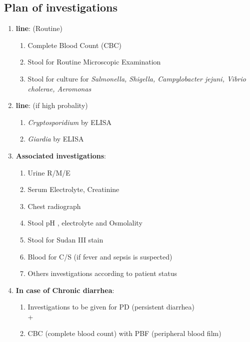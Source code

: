 \documentclass[11pt,a4paper]{report}
\begin{document}
\subsection{Plan of investigations}
\begin{enumerate}
	\item \textbf{ line}: (Routine)
	\begin{enumerate}
		\item Complete Blood Count (CBC)
		\item Stool for Routine Microscopic Examination  
		\item Stool for culture for \textit{Salmonella, Shigella, Campylobacter jejuni, Vibrio cholerae, Aeromonas}
	\end{enumerate}
	\item \textbf{ line}: (if high probality)
	\begin{enumerate}
		\item \textit{Cryptosporidium} by  ELISA
		\item \textit{Giardia} by ELISA
	\end{enumerate}
	\item \textbf{Associated investigations}:
	\begin{enumerate}
		\item Urine R/M/E
		\item Serum Electrolyte, Creatinine
		\item Chest radiograph
		\item Stool pH , electrolyte and Osmolality
		\item Stool for Sudan III stain
		\item Blood for C/S (if fever and sepsis is suspected)
		\item Others investigations according to patient status
	\end{enumerate}
	\item \textbf{In case of Chronic diarrhea}:
	\begin{enumerate}[noitemsep]
		\item Investigations to be given for PD (persistent diarrhea) \\+
		\item CBC (complete blood count) with PBF (peripheral blood film)
	\end{enumerate}
\end{enumerate}
\end{document}
